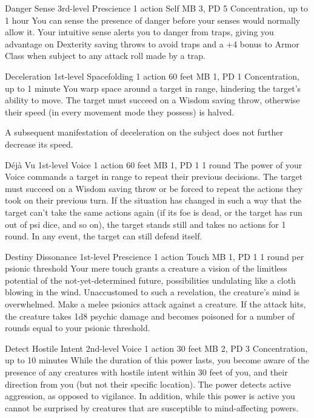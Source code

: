 \DndPowerHeader%
  {Danger Sense}
  {3rd-level Prescience}
  {1 action}
  {Self}
  {MB 3, PD 5}
  {Concentration, up to 1 hour}
  You can sense the presence of danger
  before your senses would normally allow it.
  Your intuitive sense alerts you to danger from traps,
  giving you advantage on Dexterity saving throws to avoid traps
  and a +4 bonus to Armor Class when subject to any attack roll
  made by a trap.

\DndPowerHeader%
  {Deceleration}
  {1st-level Spacefolding}
  {1 action}
  {60 feet}
  {MB 1, PD 1}
  {Concentration, up to 1 minute}
You warp space around a target in range,
hindering the target's ability to move.
The target must succeed on a Wisdom saving throw,
otherwise their speed (in every movement mode they possess) is halved.

A subsequent manifestation of deceleration on the subject
does not further decrease its speed.

\DndPowerHeader%
  {Déjà Vu}
  {1st-level Voice}
  {1 action}
  {60 feet}
  {MB 1, PD 1}
  {1 round}
The power of your Voice commands a target in range
to repeat their previous decisions.
The target must succeed on a Wisdom saving throw
or be forced to repeat the actions they took on their previous turn.
If the situation has changed in such a way that the target
can't take the same actions again
(if its foe is dead, or the target has run out of psi dice, and so on),
the target stands still and takes no actions for 1 round.
In any event, the target can still defend itself.

\DndPowerHeader%
  {Destiny Dissonance}
  {1st-level Prescience}
  {1 action}
  {Touch}
  {MB 1, PD 1}
  {1 round per psionic threshold}
  Your mere touch grants a creature
  a vision of the limitless potential
  of the not-yet-determined future,
  possibilities undulating like a cloth blowing in the wind.
  Unaccustomed to such a revelation,
  the creature's mind is overwhelmed.
  Make a melee psionics attack against a creature.
  If the attack hits,
  the creature takes 1d8 psychic damage
  and becomes poisoned for a number of rounds
  equal to your psionic threshold.

\DndPowerHeader%
  {Detect Hostile Intent}
  {2nd-level Voice}
  {1 action}
  {30 feet}
  {MB 2, PD 3}
  {Concentration, up to 10 minutes}
  While the duration of this power lasts,
  you become aware of the presence of any creatures with hostile intent
  within 30 feet of you,
  and their direction from you
  (but not their specific location).
  The power detects active aggression,
  as opposed to vigilance.
  In addition, while this power is active you cannot be surprised
  by creatures that are susceptible to mind-affecting powers.


